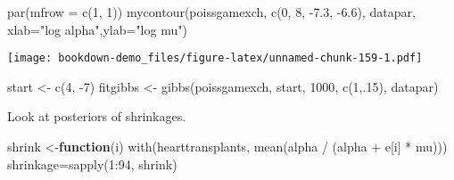 \documentclass[
]{book}
\newenvironment{Shaded}{\begin{snugshade}}{\end{snugshade}}
\newcommand{\AttributeTok}[1]{\textcolor[rgb]{0.77,0.63,0.00}{#1}}
\newcommand{\ControlFlowTok}[1]{\textcolor[rgb]{0.13,0.29,0.53}{\textbf{#1}}}
\newcommand{\DecValTok}[1]{\textcolor[rgb]{0.00,0.00,0.81}{#1}}
\newcommand{\FloatTok}[1]{\textcolor[rgb]{0.00,0.00,0.81}{#1}}
\newcommand{\FunctionTok}[1]{\textcolor[rgb]{0.00,0.00,0.00}{#1}}
\newcommand{\NormalTok}[1]{#1}
\newcommand{\OtherTok}[1]{\textcolor[rgb]{0.56,0.35,0.01}{#1}}
\newcommand{\SpecialCharTok}[1]{\textcolor[rgb]{0.00,0.00,0.00}{#1}}
\newcommand{\StringTok}[1]{\textcolor[rgb]{0.31,0.60,0.02}{#1}}
\begin{document}
\begin{Shaded}
\begin{Highlighting}[]
\FunctionTok{par}\NormalTok{(}\AttributeTok{mfrow =} \FunctionTok{c}\NormalTok{(}\DecValTok{1}\NormalTok{, }\DecValTok{1}\NormalTok{))}
\FunctionTok{mycontour}\NormalTok{(poissgamexch, }
          \FunctionTok{c}\NormalTok{(}\DecValTok{0}\NormalTok{, }\DecValTok{8}\NormalTok{, }\SpecialCharTok{{-}}\FloatTok{7.3}\NormalTok{, }\SpecialCharTok{{-}}\FloatTok{6.6}\NormalTok{), datapar,}
          \AttributeTok{xlab=}\StringTok{"log alpha"}\NormalTok{,}\AttributeTok{ylab=}\StringTok{"log mu"}\NormalTok{)}
\end{Highlighting}
\end{Shaded}

\texttt{[image: bookdown-demo\_files/figure-latex/unnamed-chunk-159-1.pdf]}

\begin{Shaded}
\begin{Highlighting}[]
\NormalTok{start }\OtherTok{\textless{}{-}} \FunctionTok{c}\NormalTok{(}\DecValTok{4}\NormalTok{, }\SpecialCharTok{{-}}\DecValTok{7}\NormalTok{)}
\NormalTok{fitgibbs }\OtherTok{\textless{}{-}} \FunctionTok{gibbs}\NormalTok{(poissgamexch, }
\NormalTok{                  start, }\DecValTok{1000}\NormalTok{, }
                  \FunctionTok{c}\NormalTok{(}\DecValTok{1}\NormalTok{,.}\DecValTok{15}\NormalTok{), datapar)}
\end{Highlighting}
\end{Shaded}

\begin{Shaded}
\end{Shaded}

Look at posteriors of shrinkages.

\begin{Shaded}
\begin{Highlighting}[]
\NormalTok{shrink }\OtherTok{\textless{}{-}}\ControlFlowTok{function}\NormalTok{(i)}
\FunctionTok{with}\NormalTok{(hearttransplants,}
       \FunctionTok{mean}\NormalTok{(alpha }\SpecialCharTok{/}\NormalTok{ (alpha }\SpecialCharTok{+}\NormalTok{ e[i] }\SpecialCharTok{*}\NormalTok{ mu)))}
\NormalTok{shrinkage}\OtherTok{=}\FunctionTok{sapply}\NormalTok{(}\DecValTok{1}\SpecialCharTok{:}\DecValTok{94}\NormalTok{, shrink)}
\end{Highlighting}
\end{Shaded}
\end{document}
